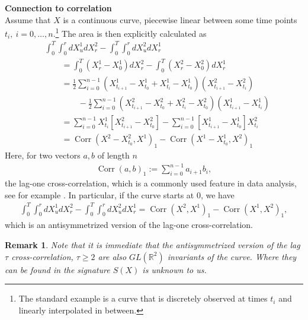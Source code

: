 \documentclass{scrartcl}
\theoremstyle{plain}
\newtheorem{remark}[theorem]{Remark}
\theoremstyle{definition}
\newcommand{\R}{\mathbb{R}}
\newcommand{\1}[1]{1_{\{#1\}}}
\begin{document}
\textbf{Connection to correlation}\\
Assume that $X$ is a continuous curve,
piecewise linear between some time points $t_i,\ i=0,\dots,n$.\footnote
{
  The standard example is a curve that is discretely observed at times $t_i$
  and linearly interpolated in between.
}
The area is then explicitly calculated as
\begin{align*}
  &\int_0^T \int_0^r d X^1_u dX^2_r - \int_0^T \int_0^r dX^2_u dX^1_r \\
  &\qquad=
  \int_0^T \left( X^1_r - X^1_0 \right) dX^2_r - \int_0^T \left( X^2_r - X^2_0 \right) dX^1_r \\
  &\qquad=
  \frac12 \sum_{i=0}^{n-1} \left( X^1_{t_{i+1}} - X^1_{t_0} + X^1_{t_i} - X^1_{t_0} \right) \left(X^2_{t_{i+1}} - X^2_{t_i} \right)
  \\&\qquad\qquad-
  \frac12 \sum_{i=0}^{n-1} \left( X^2_{t_{i+1}} - X^2_{t_0} + X^2_{t_i} - X^2_{t_0} \right) \left(X^1_{t_{i+1}} - X^1_{t_i} \right) \\
  &\qquad=
  \sum_{i=0}^{n-1} X^1_{t_i} \left[ X^2_{t_{i+1}} - X^2_{t_0} \right] - \sum_{i=0}^{n-1} \left[ X^1_{t_{i+1}} - X^1_{t_0} \right] X^2_{t_i}
  \\
  &\qquad=
  \operatorname{Corr}(X^2-X^2_{t_0},X^1)_1 - \operatorname{Corr}(X^1-X^1_{t_0},X^2)_1
\end{align*}
Here, for two vectors $a,b$ of length $n$
\begin{align*}
  \operatorname{Corr}(a,b)_1 := \sum_{i=0}^{n-1} a_{i+1} b_i,
\end{align*}
the lag-one cross-correlation, which
is a commonly used feature in data analysis, see for example \cite[Chapter 13.2]{bib:PTVF2007}.
%
%
In particular, if the curve starts at $0$, we have
\begin{align*}
  \int_0^T \int_0^r d X^1_u dX^2_r - \int_0^T \int_0^r dX^2_u dX^1_r
  =
  \operatorname{Corr}(X^2,X^1)_1 - \operatorname{Corr}(X^1,X^2)_1,
\end{align*}
which is an antisymmetrized version of the lag-one cross-correlation.

\begin{remark}
  Note that it is immediate that the antisymmetrized version of the lag $\tau$ cross-correlation,
  $\tau \ge 2$ are also $GL(\R^2)$ invariants of the curve.
  Where they can be found in the signature $S(X)$ is unknown to us.
\end{remark}
\end{document}
